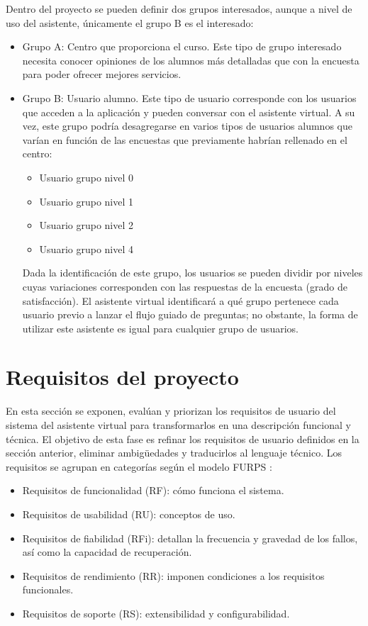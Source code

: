 Dentro del proyecto se pueden definir dos grupos interesados, aunque a nivel de uso del asistente, únicamente el grupo B es el interesado:
\begin{itemize}
    \item Grupo A: Centro que proporciona el curso. Este tipo de grupo interesado necesita conocer opiniones de los alumnos más detalladas que con la encuesta para poder ofrecer mejores servicios.
    \item Grupo B: Usuario alumno. Este tipo de usuario corresponde con los usuarios que acceden a la aplicación y pueden conversar con el asistente virtual. A su vez, este grupo podría desagregarse en varios tipos de usuarios alumnos que varían en función de las encuestas que previamente habrían rellenado en el centro:
    \begin{itemize}
        \item Usuario grupo nivel 0
        \item Usuario grupo nivel 1
        \item Usuario grupo nivel 2
        \item Usuario grupo nivel 4
    \end{itemize}

Dada la identificación de este grupo, los usuarios se pueden dividir por niveles cuyas variaciones corresponden con las respuestas de la encuesta (grado de satisfacción). El asistente virtual identificará a qué grupo pertenece cada usuario previo a lanzar el flujo guiado de preguntas; no obstante, la forma de utilizar este asistente es igual para cualquier grupo de usuarios.

\end{itemize}








\section{Requisitos del proyecto}

En esta sección se exponen, evalúan y priorizan los requisitos de usuario del sistema del asistente virtual para transformarlos en una descripción funcional y técnica. El objetivo de esta fase es refinar los requisitos de usuario definidos en la sección anterior, eliminar ambigüedades y traducirlos al lenguaje técnico. Los requisitos se agrupan en categorías según el modelo FURPS \cite{furps:2010}:

\begin{itemize}
    \item Requisitos de funcionalidad (RF): cómo funciona el sistema.
    \item Requisitos de usabilidad (RU): conceptos de uso.
    \item Requisitos de fiabilidad (RFi): detallan la frecuencia y gravedad de los fallos, así como la capacidad de recuperación.
    \item Requisitos de rendimiento (RR): imponen condiciones a los requisitos funcionales.
    \item Requisitos de soporte (RS): extensibilidad y configurabilidad.
\end{itemize}

